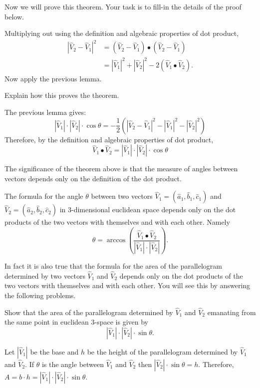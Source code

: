 \documentclass{ximera}
\begin{document}
Now we will prove this theorem. Your task is to fill-in the details of
the proof below.

\begin{problem}
Multiplying out using the definition and algebraic properties of dot product,%
\begin{align*}
\left\vert \hat{V}_{2}-\hat{V}_{1}\right\vert ^{2}  &  =\left(  \hat{V}%
_{2}-\hat{V}_{1}\right)  \bullet\left(  \hat{V}_{2}-\hat{V}_{1}\right) \\
&  =\left\vert \hat{V}_{1}\right\vert ^{2}+\left\vert \hat{V}_{2}\right\vert
^{2}-2\left(  \hat{V}_{1}\bullet\hat{V}_{2}\right)  .
\end{align*}
Now apply the previous lemma.

Explain how this proves the theorem.
\begin{freeResponse}
The previous lemma gives:
\[
|\hat{V}_{1}|\cdot|\hat{V}_{2}|\cdot\cos\theta = -\frac{1}{2}\left(|\hat{V}_{2}-\hat{V}_{1}|^2 -|\hat{V}_{1}|^2 - |\hat{V}_{2}|^2\right)
\]
Therefore, by the definition and algebraic properties of dot product,
\[
\hat{V}_{1}\bullet\hat{V}_{2} = |\hat{V}_{1}|\cdot|\hat{V}_{2}|\cdot\cos\theta
\]
\end{freeResponse} 
\end{problem}

The significance of the theorem above is that the measure of angles between
vectors depends only on the definition of the dot product.

\begin{corollary}
The formula for the angle $\theta$ between two vectors $\hat{V}_{1}=\left(
\hat{a}_{1},\hat{b}_{1},\hat{c}_{1}\right)  $ and $\hat{V}_{2}=\left(  \hat
{a}_{2},\hat{b}_{2},\hat{c}_{2}\right)  $ in $3$-dimensional euclidean space
depends only on the dot products of the two vectors with themselves and with
each other. Namely%
\[
\theta=\arccos\left(  \frac{\hat{V}_{1}\bullet\hat{V}_{2}%
}{\left\vert \hat{V}_{1}\right\vert \cdot\left\vert \hat{V}_{2}\right\vert
}\right)  .
\]

\end{corollary}

In fact it is also true that the formula for the area of the parallelogram
determined by two vectors $\hat{V}_{1}$ and $\hat{V}_{2}$ depends only on the
dot products of the two vectors with themselves and with each other. You will
see this by answering the following problems.

\begin{problem}
Show that the area of the parallelogram determined by $\hat{V}_{1}$ and
$\hat{V}_{2}$ emanating from the same point in euclidean $3$-space is given by%
\[
|\hat{V}_{1}|\cdot|\hat{V}_{2}|\cdot\sin\theta.
\]
\begin{freeResponse}

Let $|\hat{V}_{1}|$ be the base and $h$ be the height of the parallelogram determined by  $\hat{V}_{1}$ and $\hat{V}_{2}$.  If $\theta$ is the angle between $\hat{V}_{1}$ and $\hat{V}_{2}$ then $|\hat{V}_{2}|\cdot \sin\theta = h$. Therefore, $A = b \cdot h = |\hat{V}_{1}| \cdot |\hat{V}_{2}| \cdot\sin\theta$.

\end{freeResponse}
\end{problem}
\end{document}
